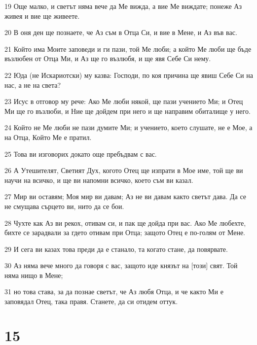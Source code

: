 \par 19 Още малко, и светът няма вече да Ме вижда, а вие Ме виждате; понеже Аз живея и вие ще живеете.
\par 20 В оня ден ще познаете, че Аз съм в Отца Си, и вие в Мене, и Аз във вас.
\par 21 Който има Моите заповеди и ги пази, той Ме люби; а който Ме люби ще бъде възлюбен от Отца Ми, и Аз ще го възлюбя, и ще явя Себе Си нему.
\par 22 Юда (не Искариотски) му казва: Господи, по коя причина ще явиш Себе Си на нас, а не на света?
\par 23 Исус в отговор му рече: Ако Ме люби някой, ще пази учението Ми; и Отец Ми ще го възлюби, и Ние ще дойдем при него и ще направим обиталище у него.
\par 24 Който не Ме люби не пази думите Ми; и учението, което слушате, не е Мое, а на Отца, Който Ме е пратил.
\par 25 Това ви изговорих докато още пребъдвам с вас.
\par 26 А Утешителят, Светият Дух, когото Отец ще изпрати в Мое име, той ще ви научи на всичко, и ще ви напомни всичко, което съм ви казал.
\par 27 Мир ви оставям; Моя мир ви давам; Аз не ви давам както светът дава. Да се не смущава сърцето ви, нито да се бои.
\par 28 Чухте как Аз ви рекох, отивам си, и пак ще дойда при вас. Ако Ме любехте, бихте се зарадвали за гдето отивам при Отца; защото Отец е по-голям от Мене.
\par 29 И сега ви казах това преди да е станало, та когато стане, да повярвате.
\par 30 Аз няма вече много да говоря с вас, защото иде князът на [този] свят. Той няма нищо в Мене;
\par 31 но това става, за да познае светът, че Аз любя Отца, и че както Ми е заповядал Отец, така правя. Станете, да си отидем оттук.

\chapter{15}

